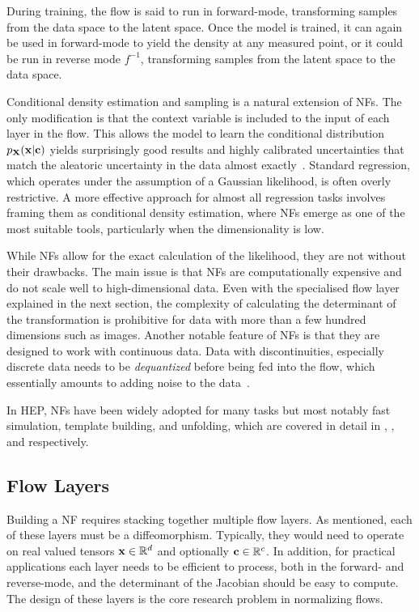 During training, the flow is said to run in forward-mode, transforming samples from the data space to the latent space.
Once the model is trained, it can again be used in forward-mode to yield the density at any measured point, or it could be run in reverse mode $f^{-1}$, transforming samples from the latent space to the data space.

Conditional density estimation and sampling is a natural extension of NFs.
The only modification is that the context variable is included to the input of each layer in the flow.
This allows the model to learn the conditional distribution $p_{\mathbf{X}}(\mathbf{x}|\mathbf{c})$ yields surprisingly good results and highly calibrated uncertainties that match the aleatoric uncertainty in the data almost exactly~\cite{SolvingInverseProblems, InferenceAstrophysicalParameters, ComposingNormalizingFlows, NormalizingFlowsProbabilistic}.
Standard regression, which operates under the assumption of a Gaussian likelihood, is often overly restrictive.
A more effective approach for almost all regression tasks involves framing them as conditional density estimation, where NFs emerge as one of the most suitable tools, particularly when the dimensionality is low.

While NFs allow for the exact calculation of the likelihood, they are not without their drawbacks.
The main issue is that NFs are computationally expensive and do not scale well to high-dimensional data.
Even with the specialised flow layer explained in the next section, the complexity of calculating the determinant of the transformation is prohibitive for data with more than a few hundred dimensions such as images.
Another notable feature of NFs is that they are designed to work with continuous data.
Data with discontinuities, especially discrete data needs to be \textit{dequantized} before being fed into the flow, which essentially amounts to adding noise to the data~\cite{FlowImprovingFlowBased}.

In HEP, NFs have been widely adopted for many tasks but most notably fast simulation, template building, and unfolding, which are covered in detail in , , and  respectively.

\subsection{Flow Layers}

Building a NF requires stacking together multiple flow layers.
As mentioned, each of these layers must be a diffeomorphism.
Typically, they would need to operate on real valued tensors $\mathbf{x} \in \mathbb{R}^d$ and optionally $\mathbf{c} \in \mathbb{R}^c$.
In addition, for practical applications each layer needs to be efficient to process, both in the forward- and reverse-mode, and the determinant of the Jacobian should be easy to compute.
The design of these layers is the core research problem in normalizing flows.

